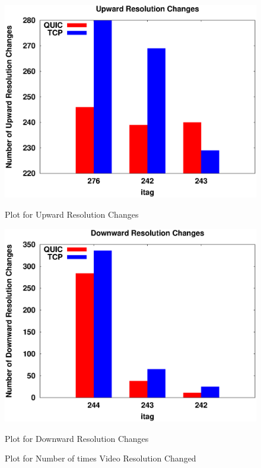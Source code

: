 \begin{figure}[ht!] 
\centering
\begin{minipage}{0.48\linewidth}
\includegraphics[width=\linewidth]{img/CDF/Data_up} 
\caption{Plot for Upward Resolution Changes}
\label{fig:clean11Q}
\end{minipage}
\begin{minipage}{0.48\linewidth}
\includegraphics[width=\linewidth]{img/CDF/Data_down}
\caption{Plot for Downward Resolution Changes}
\label{fig:clen11T}
\end{minipage} 
\caption{Plot for Number of times Video Resolution Changed }
\label{fig:claen1}
\end{figure}



